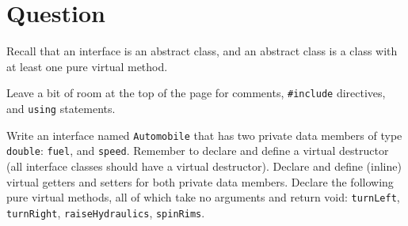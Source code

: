 \newEvenPage


\section{Question}

Recall that an interface is an abstract class, and an abstract class is a class
with at least one pure virtual method.

Leave a bit of room at the top of the page for comments,
\texttt{#include} directives, and \texttt{using} statements.

Write an interface named \texttt{Automobile} that has two private data
members of type \texttt{double}: \texttt{fuel}, and
\texttt{speed}.  Remember to declare and define a virtual destructor
(all interface classes should have a virtual destructor).  Declare and define
(inline) virtual getters and setters for both private data members.  Declare
the following pure virtual methods, all of which take no arguments and return
void: \texttt{turnLeft}, \texttt{turnRight},
\texttt{raiseHydraulics}, \texttt{spinRims}.

\newOddPage
\textQuestion{\makePageQuadrilleRuled}

\newpage

